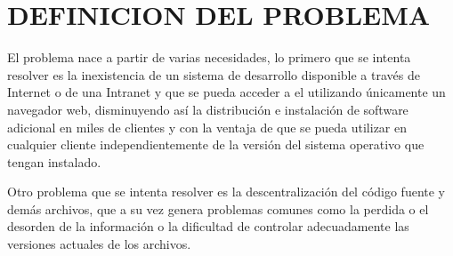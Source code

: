 \section{DEFINICION DEL PROBLEMA}

El problema nace a partir de varias necesidades, lo primero que se intenta resolver es la inexistencia de un sistema de desarrollo disponible a través de Internet o de una Intranet y que se pueda acceder a el utilizando únicamente un navegador web, disminuyendo así la distribución e instalación de software adicional en miles de clientes y con la ventaja de que se pueda utilizar en cualquier cliente independientemente de la versión del sistema operativo que tengan instalado.

Otro problema que se intenta resolver es la descentralización del código fuente y demás archivos, que a su vez genera problemas comunes como la perdida o el desorden de la información o la dificultad de controlar adecuadamente las versiones actuales de los archivos.
